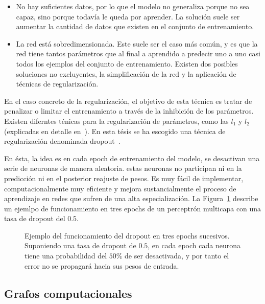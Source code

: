 \begin{itemize}
	\item No hay suficientes datos, por lo que el modelo no generaliza porque no sea capaz, sino porque todavía le queda por aprender. La solución suele ser aumentar la cantidad de datos que existen en el conjunto de entrenamiento.
	\item La red está sobredimensionada. Este suele ser el caso más común, y es que la red tiene tantos parámetros que al final a aprendido a predecir uno a uno casi todos los ejemplos del conjunto de entrenamiento. Existen dos posibles soluciones no excluyentes, la simplificación de la red y la aplicación de técnicas de regularización.
\end{itemize}

En el caso concreto de la regularización, el objetivo de esta técnica es tratar de penalizar o limitar el entrenamiento a través de la inhibición de los parámetros. Existen diferntes ténicas para la regularización de parámetros, como las $l_1$ y $l_2$ (explicadas en detalle en~\cite{ng2004feature}). En esta tésis se ha escogido una técnica de regularización denominada dropout~\cite{srivastava2014dropout}.

En ésta, la idea es en cada epoch de entrenamiento del modelo, se desactivan una serie de neuronas de manera aleatoria. estas neuronas no participan ni en la predicción ni en el posterior reajuste de pesos. Es muy fácil de implementar, computacionalmente muy eficiente y mejora sustancialmente el proceso de aprendizaje en redes que sufren de una alta especialización. La Figura~\ref{fig:dropout-example} describe un ejemlpo de funcionamiento en tres epochs de un perceptrón multicapa con una tasa de dropout del $0.5$.

\begin{figure}[t]
	\centering
	\qquad
	\qquad
	\caption[Ejemplo de la operación de dropout en tres epochs sucesivos.]{Ejemplo del funcionamiento del dropout en tres epochs sucesivos. Suponiendo una tasa de dropout de $0.5$, en cada epoch cada neurona tiene una probabilidad del $50\%$ de ser desactivada, y por tanto el error no se propagará hacia sus pesos de entrada.}
	\label{fig:dropout-example}
\end{figure}

\subsection{Grafos computacionales}

